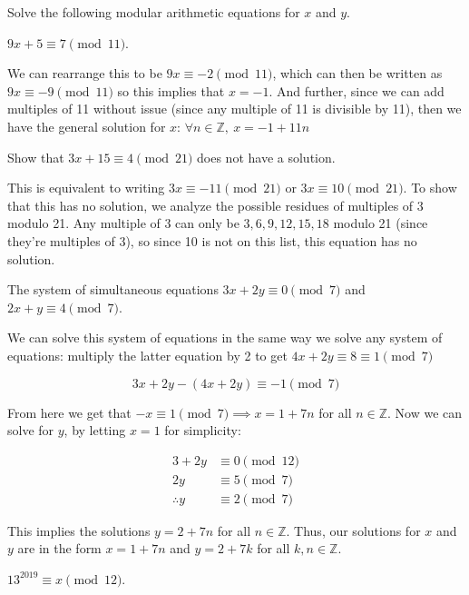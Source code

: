 \documentclass[11pt]{article}
\begin{document}
Solve the following modular arithmetic equations for $x$ and $y$.
\begin{Parts}
\Part $9x+5 \equiv 7 \pmod{11}$.

\begin{solution} 
  We can rearrange this to be $9x \equiv -2 \pmod{11}$, which can then be written as $9x \equiv -9 \pmod{11}$ so this implies that $x = -1$. And further, since we can add multiples of 11 without issue (since any multiple of 11 is divisible by 11), then we have the general solution for $x$: $\forall n \in \mathbb Z, \  x = -1 + 11n$
\end{solution}

\Part Show that $3x+15 \equiv 4 \pmod{21}$ does not have a solution.

\begin{solution}
  This is equivalent to writing $3x \equiv -11 \pmod{21}$ or $3x \equiv 10 \pmod{21}$. To show that this has no solution, we analyze the possible residues of multiples of 3 modulo 21. Any multiple of 3 can only be $3, 6, 9, 12, 15, 18$ modulo 21 (since they're multiples of 3), so since 10 is not on this list, this equation has no solution. 
\end{solution}

\Part The system of simultaneous equations
$3x+2y \equiv 0 \pmod{7}$ and $2x+y \equiv 4 \pmod{7}$.

\begin{solution}
  We can solve this system of equations in the same way we solve any system of equations: multiply the latter equation by 2 to get $4x + 2y \equiv 8 \equiv 1 \pmod 7$

  \[ 3x + 2y - (4x + 2y) \equiv -1 \pmod{7}\] 

  From here we get that $-x \equiv 1 \pmod 7 \implies x = 1 + 7n$ for all $n \in \mathbb Z$. Now we can solve for $y$, by letting $x =1$ for simplicity: 

  \begin{align*}
    3 + 2y &\equiv 0 \pmod{12}\\
    2y &\equiv 5 \pmod 7\\
    \therefore y &\equiv 2 \pmod {7}
  \end{align*}

  This implies the solutions $y = 2 + 7n$ for all $n \in \mathbb Z$. Thus, our solutions for $x$ and $y$ are in the form $x = 1 + 7n$ and $y = 2 + 7k$ for all $k, n \in \mathbb Z$.
\end{solution}

\Part $13^{2019} \equiv x \pmod{12}$.



\end{Parts}
\end{document}
